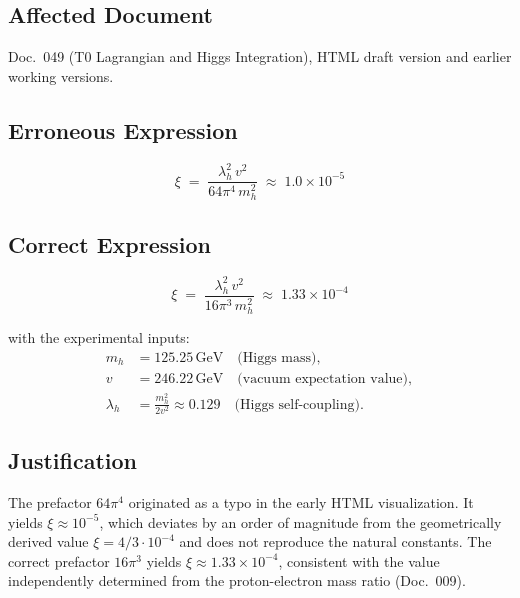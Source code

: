 \subsection*{Affected Document}

Doc.~049 (T0 Lagrangian and Higgs Integration), HTML draft version
and earlier working versions.

\subsection*{Erroneous Expression}

\begin{equation}
  \xi \;=\; \frac{\lambda_h^2\, v^2}{64\pi^4\, m_h^2}
  \;\approx\; 1.0 \times 10^{-5}
  \tag{old -- wrong}
\end{equation}

\subsection*{Correct Expression}

\begin{equation}
  \boxed{
    \xi \;=\; \frac{\lambda_h^2\, v^2}{16\pi^3\, m_h^2}
    \;\approx\; 1.33 \times 10^{-4}
  }
  \tag{190.1}
\end{equation}

with the experimental inputs:
\begin{align*}
  m_h      &= 125.25\,\text{GeV} \quad \text{(Higgs mass)}, \\
  v        &= 246.22\,\text{GeV} \quad \text{(vacuum expectation value)}, \\
  \lambda_h &= \frac{m_h^2}{2v^2} \approx 0.129
               \quad \text{(Higgs self-coupling)}.
\end{align*}

\subsection*{Justification}

The prefactor $64\pi^4$ originated as a typo in the early
HTML visualization. It yields $\xi \approx 10^{-5}$, which deviates by
an order of magnitude from the geometrically derived value
$\xi = 4/3 \cdot 10^{-4}$ and does not reproduce the natural constants.
The correct prefactor $16\pi^3$ yields
$\xi \approx 1.33 \times 10^{-4}$, consistent with the value
independently determined from the proton-electron mass ratio (Doc.~009).

